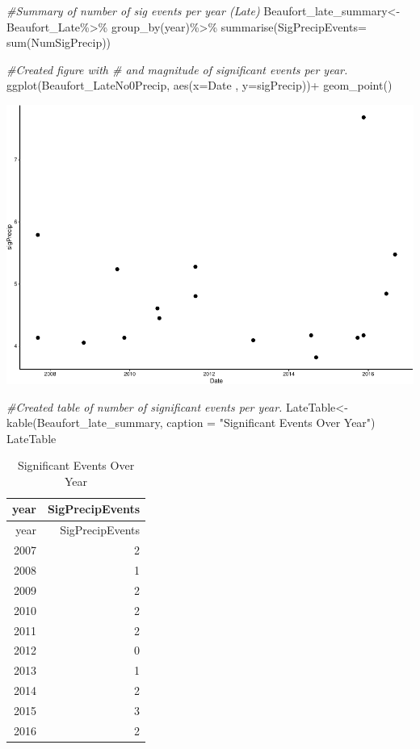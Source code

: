 \documentclass[
  12pt,
]{article}
\newenvironment{Shaded}{\begin{snugshade}}{\end{snugshade}}
\newcommand{\AttributeTok}[1]{\textcolor[rgb]{0.77,0.63,0.00}{#1}}
\newcommand{\CommentTok}[1]{\textcolor[rgb]{0.56,0.35,0.01}{\textit{#1}}}
\newcommand{\FunctionTok}[1]{\textcolor[rgb]{0.00,0.00,0.00}{#1}}
\newcommand{\NormalTok}[1]{#1}
\newcommand{\OtherTok}[1]{\textcolor[rgb]{0.56,0.35,0.01}{#1}}
\newcommand{\SpecialCharTok}[1]{\textcolor[rgb]{0.00,0.00,0.00}{#1}}
\newcommand{\StringTok}[1]{\textcolor[rgb]{0.31,0.60,0.02}{#1}}
\begin{document}
\begin{Shaded}
\begin{Highlighting}[]
\CommentTok{\#Summary of number of sig events per year (Late)}
\NormalTok{Beaufort\_late\_summary}\OtherTok{\textless{}{-}}\NormalTok{ Beaufort\_Late}\SpecialCharTok{\%\textgreater{}\%}
  \FunctionTok{group\_by}\NormalTok{(year)}\SpecialCharTok{\%\textgreater{}\%}
  \FunctionTok{summarise}\NormalTok{(}\AttributeTok{SigPrecipEvents=} \FunctionTok{sum}\NormalTok{(NumSigPrecip))}

\CommentTok{\#Created figure with \# and magnitude of significant events per year.}
\FunctionTok{ggplot}\NormalTok{(Beaufort\_LateNo0Precip, }\FunctionTok{aes}\NormalTok{(}\AttributeTok{x=}\NormalTok{Date , }\AttributeTok{y=}\NormalTok{sigPrecip))}\SpecialCharTok{+}
  \FunctionTok{geom\_point}\NormalTok{()}
\end{Highlighting}
\end{Shaded}

\includegraphics{Project_Template_TLK_files/figure-latex/late-1.pdf}

\begin{Shaded}
\begin{Highlighting}[]
\CommentTok{\#Created table of number of significant events per year.}
\NormalTok{LateTable}\OtherTok{\textless{}{-}} \FunctionTok{kable}\NormalTok{(Beaufort\_late\_summary, }\AttributeTok{caption =} \StringTok{"Significant Events Over Year"}\NormalTok{)}
\NormalTok{LateTable}
\end{Highlighting}
\end{Shaded}

\begin{longtable}[]{@{}rr@{}}
\caption{Significant Events Over Year}\tabularnewline
\toprule
year & SigPrecipEvents \\
\midrule
\endfirsthead
\toprule
year & SigPrecipEvents \\
\midrule
\endhead
2007 & 2 \\
2008 & 1 \\
2009 & 2 \\
2010 & 2 \\
2011 & 2 \\
2012 & 0 \\
2013 & 1 \\
2014 & 2 \\
2015 & 3 \\
2016 & 2 \\
\bottomrule
\end{longtable}
\end{document}
